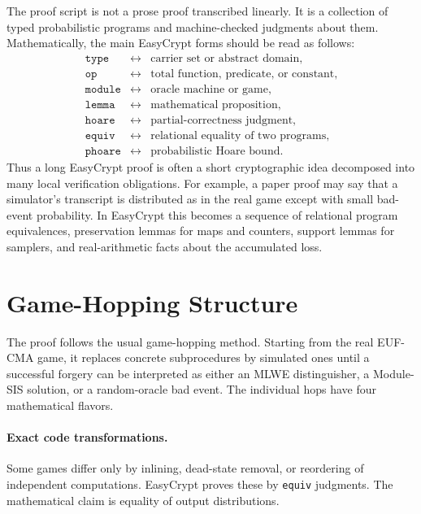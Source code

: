 \documentclass[11pt]{report}
\theoremstyle{definition}
\theoremstyle{plain}
\theoremstyle{definition}
\begin{document}
The proof script is not a prose proof transcribed linearly.  It is a collection
of typed probabilistic programs and machine-checked judgments about them.
Mathematically, the main EasyCrypt forms should be read as follows:
\[
  \begin{array}{lll}
  \texttt{type} & \leftrightarrow & \text{carrier set or abstract domain},\\
  \texttt{op} & \leftrightarrow & \text{total function, predicate, or constant},\\
  \texttt{module} & \leftrightarrow & \text{oracle machine or game},\\
  \texttt{lemma} & \leftrightarrow & \text{mathematical proposition},\\
  \texttt{hoare} & \leftrightarrow & \text{partial-correctness judgment},\\
  \texttt{equiv} & \leftrightarrow & \text{relational equality of two programs},\\
  \texttt{phoare} & \leftrightarrow & \text{probabilistic Hoare bound}.
  \end{array}
\]
Thus a long EasyCrypt proof is often a short cryptographic idea decomposed into
many local verification obligations.  For example, a paper proof may say that a
simulator's transcript is distributed as in the real game except with small
bad-event probability.  In EasyCrypt this becomes a sequence of relational
program equivalences, preservation lemmas for maps and counters, support lemmas
for samplers, and real-arithmetic facts about the accumulated loss.

\section*{Game-Hopping Structure}

The proof follows the usual game-hopping method.  Starting from the real
EUF-CMA game, it replaces concrete subprocedures by simulated ones until a
successful forgery can be interpreted as either an MLWE distinguisher, a
Module-SIS solution, or a random-oracle bad event.  The individual hops have
four mathematical flavors.

\paragraph{Exact code transformations.}
Some games differ only by inlining, dead-state removal, or reordering of
independent computations.  EasyCrypt proves these by \texttt{equiv} judgments.
The mathematical claim is equality of output distributions.
\end{document}
